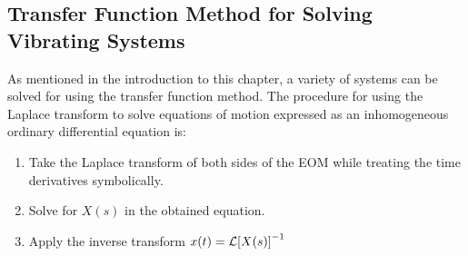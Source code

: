 \documentclass[12pt,letter]{article}
\begin{document}
		\subsection{Transfer Function Method for Solving Vibrating Systems}
		
			As mentioned in the introduction to this chapter, a variety of systems can be solved for using the transfer function method. The procedure for using the Laplace transform to solve equations of motion expressed as an inhomogeneous ordinary differential equation is:
			\begin{enumerate}
				\item Take the Laplace transform of both sides of the EOM while treating the time derivatives symbolically.
				\item Solve for $X(s)$ in the obtained equation.
				\item Apply the inverse transform $x(t) = \mathcal{L}{\left[X(s)\right]}^{-1}$
			\end{enumerate}
				
\end{document}
